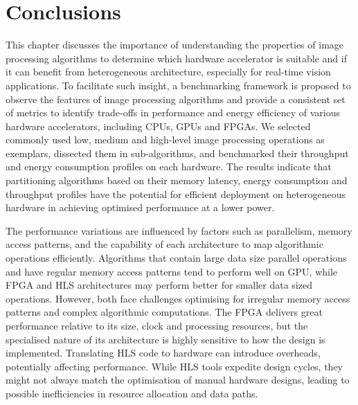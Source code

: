 \section{Conclusions}
\label{sec:conclusion}
This chapter discusses the importance of understanding the properties of image processing algorithms to determine which hardware accelerator is suitable and if it can benefit from heterogeneous architecture, especially for real-time vision applications. To facilitate such insight, a benchmarking framework is proposed to observe the features of image processing algorithms and provide a consistent set of metrics to identify trade-offs in performance and energy efficiency of various hardware accelerators, including CPUs, GPUs and FPGAs. We selected commonly used low, medium and high-level image processing operations as exemplars, dissected them in sub-algorithms, and benchmarked their throughput and energy consumption profiles on each hardware. The results indicate that partitioning algorithms based on their memory latency, energy consumption and throughput profiles have the potential for efficient deployment on heterogeneous hardware in achieving optimised performance at a lower power.

The performance variations are influenced by factors such as parallelism, memory access patterns, and the capability of each architecture to map algorithmic operations efficiently. Algorithms that contain large data size parallel operations and have regular memory access patterns tend to perform well on GPU, while FPGA and HLS architectures may perform better for smaller data sized operations. However, both face challenges optimising for irregular memory access patterns and complex algorithmic computations. The FPGA delivers great performance relative to its size, clock and processing resources, but the specialised nature of its architecture is highly sensitive to how the design is implemented. Translating HLS code to hardware can introduce overheads, potentially affecting performance. While HLS tools expedite design cycles, they might not always match the optimisation of manual hardware designs, leading to possible inefficiencies in resource allocation and data paths.


